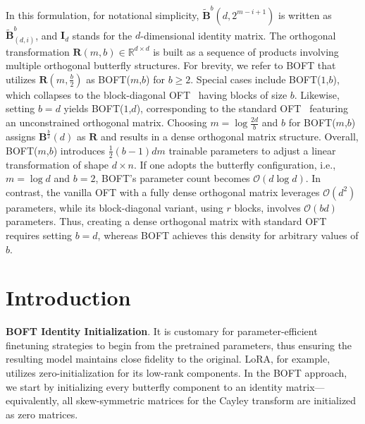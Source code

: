 In this formulation, for notational simplicity, $\tilde{\bm{B}}^b(d,2^{m - i+1})$ is written as $\tilde{\bm{B}}^b_{(d,i)}$, and $\bm{I}_d$ stands for the $d$-dimensional identity matrix. The orthogonal transformation $\bm{R}(m,b)\in\mathbb{R}^{d\times d}$ is built as a sequence of products involving multiple orthogonal butterfly structures. For brevity, we refer to BOFT that utilizes $\bm{R}(m,\frac{b}{2})$ as BOFT($m$,$b$) for $b\geq 2$. Special cases include BOFT($1$,$b$), which collapses to the block-diagonal OFT~\cite{qiu2023controlling} having blocks of size $b$. Likewise, setting $b=d$ yields BOFT($1$,$d$), corresponding to the standard OFT~\cite{qiu2023controlling} featuring an unconstrained orthogonal matrix. Choosing $m = \log \frac{2d}{b}$ and $b$ for BOFT($m$,$b$) assigns $\bm{B}^{\frac{b}{2}}(d)$ as $\bm{R}$ and results in a dense orthogonal matrix structure. Overall, BOFT($m$,$b$) introduces $\frac{1}{2}(b-1)dm$ trainable parameters to adjust a linear transformation of shape $d\times n$. If one adopts the butterfly configuration, i.e., $m=\log d$ and $b=2$, BOFT’s parameter count becomes $\mathcal{O}(d\log d)$. In contrast, the vanilla OFT with a fully dense orthogonal matrix leverages $\mathcal{O}(d^2)$ parameters, while its block-diagonal variant, using $r$ blocks, involves $\mathcal{O}(bd)$ parameters. Thus, creating a dense orthogonal matrix with standard OFT requires setting $b=d$, whereas BOFT achieves this density for arbitrary values of $b$.

\section{Introduction}

\textbf{BOFT Identity Initialization}. It is customary for parameter-efficient finetuning strategies to begin from the pretrained parameters, thus ensuring the resulting model maintains close fidelity to the original. LoRA, for example, utilizes zero-initialization for its low-rank components. In the BOFT approach, we start by initializing every butterfly component to an identity matrix—equivalently, all skew-symmetric matrices for the Cayley transform are initialized as zero matrices.

